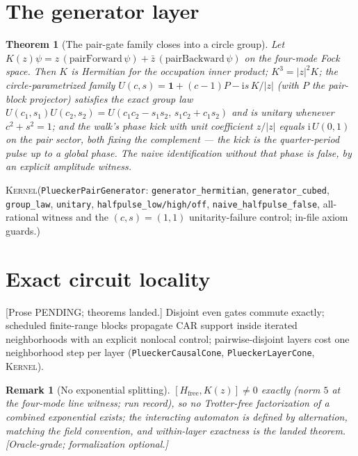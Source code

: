 \documentclass[11pt]{article}
\newcommand{\ii}{\mathrm{i}}
\newcommand{\id}{\mathbf{1}}
\newcommand{\Kernel}{\textcolor{kernelcolor}{\textsc{Kernel}}}
\newtheorem{theorem}{Theorem}
\newtheorem{remark}{Remark}
\begin{document}
\section{The generator layer}

\begin{theorem}[The pair-gate family closes into a circle group]\label{thm:gen}
Let $K(z)\psi = z\,(\text{pairForward}\,\psi) +
\bar z\,(\text{pairBackward}\,\psi)$ on the four-mode Fock space.  Then
$K$ is Hermitian for the occupation inner product; $K^3=|z|^2K$; the
circle-parametrized family
$U(c,s)=\id+(c-1)P-\ii s\,K/|z|$ (with $P$ the pair-block projector)
satisfies the exact group law
$U(c_1,s_1)U(c_2,s_2)=U(c_1c_2-s_1s_2,\,s_1c_2+c_1s_2)$ and is unitary
whenever $c^2+s^2=1$; and the walk's phase kick with unit coefficient
$z/|z|$ equals $\ii\,U(0,1)$ on the pair sector, both fixing the
complement --- the kick is the quarter-period pulse up to a global
phase.  The naive identification without that phase is false, by an
explicit amplitude witness.
\end{theorem}
\noindent\Kernel{}\quad(\texttt{PlueckerPairGenerator}:
\texttt{generator\_hermitian}, \texttt{generator\_cubed},
\texttt{group\_law}, \texttt{unitary}, \texttt{halfpulse\_low/high/off},
\texttt{naive\_halfpulse\_false}, all-rational witness and the
$(c,s)=(1,1)$ unitarity-failure control; in-file axiom guards.)

\section{Exact circuit locality}
[Prose PENDING; theorems landed.]  Disjoint even gates commute exactly;
scheduled finite-range blocks propagate CAR support inside iterated
neighborhoods with an explicit nonlocal control; pairwise-disjoint
layers cost one neighborhood step per layer
(\texttt{PlueckerCausalCone}, \texttt{PlueckerLayerCone}, \Kernel{}).

\begin{remark}[No exponential splitting]
$[H_{\mathrm{free}},K(z)]\neq0$ exactly (norm $5$ at the four-mode line
witness; run record), so no Trotter-free factorization of a combined
exponential exists; the interacting automaton is \emph{defined} by
alternation, matching the field convention, and within-layer exactness
is the landed theorem.  [Oracle-grade; formalization optional.]
\end{remark}
\end{document}
